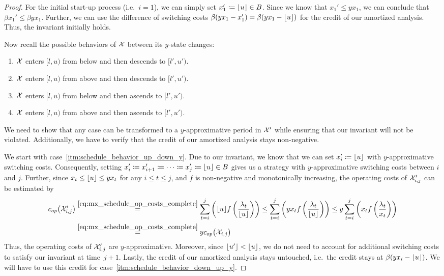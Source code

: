 \begin{proof}
For the initial start-up process (i.e.\ $i=1$), we can simply set $x_1'\coloneqq \lfloor u\rfloor \in B$. Since we know that $x_1'\le yx_1$, we can conclude that $\beta x_1'\le\beta yx_1$. Further, we can use the difference of switching costs $\beta(yx_1-x_1')=\beta(yx_1-\lfloor u\rfloor)$ for the credit of our amortized analysis. Thus, the invariant initially holds.

Now recall the possible behaviors of $\mathcal{X}$ between its $y$-state changes:
\begin{enumerate}[label=(\alph*)]
	\item $\mathcal{X}$ enters $[l,u)$ from below and then descends to $[l',u')$.\label{itm:schedule_behavior_up_down_y}
	\item $\mathcal{X}$ enters $[l,u)$ from above and then descends to $[l',u')$.\label{itm:schedule_behavior_down_down_y}
	\item $\mathcal{X}$ enters $[l,u)$ from below and then ascends to $[l',u')$.\label{itm:schedule_behavior_up_up_y} 
	\item $\mathcal{X}$ enters $[l,u)$ from above and then ascends to $[l',u')$.\label{itm:schedule_behavior_down_up_y} 
\end{enumerate}
We need to show that any case can be transformed to a $y$-approximative period in $\mathcal{X}'$ while ensuring that our invariant will not be violated. Additionally, we have to verify that the credit of our amortized analysis stays non-negative.

We start with case~\ref{itm:schedule_behavior_up_down_y}. Due to our invariant, we know that we can set $x_i'\coloneqq \lfloor u\rfloor$ with $y$-approximative switching costs. Consequently, setting $x_i'\coloneqq x_{i+1}'\coloneqq\dotsb\coloneqq x_j'\coloneqq \lfloor u\rfloor\in B$ gives us a strategy with $y$-approximative switching costs between $i$ and $j$. Further, since $x_t\le \lfloor u\rfloor\le yx_t$ for any $i\le t\le j$, and $f$ is non-negative and monotonically increasing, the operating costs of $\mathcal{X}'_{i,j}$ can be estimated by
\begin{align*}
	c_{op}\bigl(\mathcal{X}_{i,j}'\bigr)&\stackrel{\eqref{eq:mx_schedule_op_costs_complete}}{=}\sum\limits_{t=i}^j\left(\lfloor u\rfloor f\left(\frac{\lambda_t}{\lfloor u\rfloor}\right)\right)\le\sum\limits_{t=i}^j\left(yx_tf\left(\frac{\lambda_t}{\lfloor u\rfloor}\right)\right)\le y\sum\limits_{t=i}^j\left(x_tf\left(\frac{\lambda_t}{x_t}\right)\right)\\
	&\stackrel{\eqref{eq:mx_schedule_op_costs_complete}}{=}yc_{op}\bigl(\mathcal{X}_{i,j}\bigr)
\end{align*}
Thus, the operating costs of $\mathcal{X}_{i,j}'$ are $y$-approximative. Moreover, since $\lfloor u'\rfloor<\lfloor u\rfloor$, we do not need to account for additional switching costs to satisfy our invariant at time~$j+1$. Lastly, the credit of our amortized analysis stays untouched, i.e.\ the credit stays at $\beta(yx_i-\lfloor u\rfloor)$. We will have to use this credit for case~\ref{itm:schedule_behavior_down_up_y}.


\end{proof}
